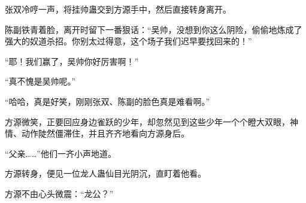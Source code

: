\begin{this_body}
张双冷哼一声，将挂帅蛊交到方源手中，然后直接转身离开。

陈副铁青着脸，离开时留下一番狠话：“吴帅，没想到你这么阴险，偷偷地炼成了强大的奴道杀招。你别太过得意，这个场子我们迟早要找回来的！”

“耶！我们赢了，吴帅你好厉害啊！”

“真不愧是吴帅呢。”

“哈哈，真是好笑，刚刚张双、陈副的脸色真是难看啊。”

方源微笑，正要回应身边雀跃的少年，却忽然见到这些少年一个个瞪大双眼，神情、动作陡然僵滞住，并且齐齐地看向方源身后。

“父亲……”他们一齐小声地道。

方源转身，便见一位龙人蛊仙目光阴沉，直盯着他看。

方源不由心头微震：“龙公？”

\end{this_body}

